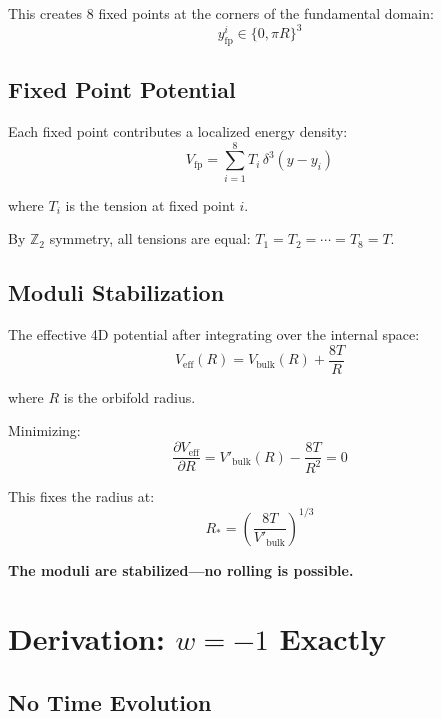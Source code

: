 \documentclass[12pt,a4paper]{article}
\begin{document}
This creates 8 fixed points at the corners of the fundamental domain:
\begin{equation}
y^i_{\text{fp}} \in \{0, \pi R\}^3
\end{equation}

\subsection{Fixed Point Potential}

Each fixed point contributes a localized energy density:
\begin{equation}
V_{\text{fp}} = \sum_{i=1}^{8} T_i \, \delta^3(y - y_i)
\end{equation}

where $T_i$ is the tension at fixed point $i$.

By $\mathbb{Z}_2$ symmetry, all tensions are equal: $T_1 = T_2 = \cdots = T_8 = T$.

\subsection{Moduli Stabilization}

The effective 4D potential after integrating over the internal space:
\begin{equation}
V_{\text{eff}}(R) = V_{\text{bulk}}(R) + \frac{8T}{R}
\end{equation}

where $R$ is the orbifold radius.

Minimizing:
\begin{equation}
\frac{\partial V_{\text{eff}}}{\partial R} = V'_{\text{bulk}}(R) - \frac{8T}{R^2} = 0
\end{equation}

This fixes the radius at:
\begin{equation}
R_* = \left(\frac{8T}{V'_{\text{bulk}}}\right)^{1/3}
\end{equation}

\textbf{The moduli are stabilized---no rolling is possible.}

\section{Derivation: $w = -1$ Exactly}

\subsection{No Time Evolution}
\end{document}

